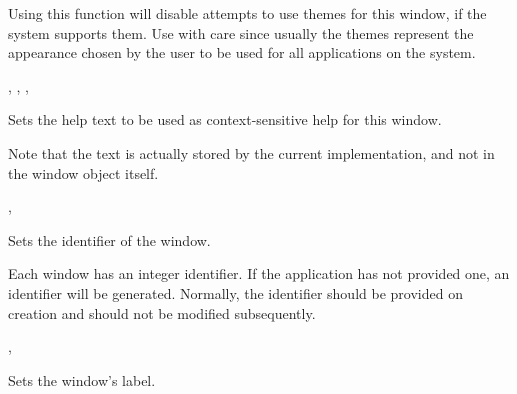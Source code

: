 Using this function will disable attempts to use themes for this
window, if the system supports them.  Use with care since usually the
themes represent the appearance chosen by the user to be used for all
applications on the system.


,\rtfsp
{},\rtfsp
{},\rtfsp
{}


\label{wxwindowsethelptext}


Sets the help text to be used as context-sensitive help for this window.

Note that the text is actually stored by the current  implementation,
and not in the window object itself.


, 


\label{wxwindowsetid}


Sets the identifier of the window.


Each window has an integer identifier. If the application has not provided one,
an identifier will be generated. Normally, the identifier should be provided
on creation and should not be modified subsequently.


,\rtfsp
{}



\label{wxwindowsetlabel}


Sets the window's label.




